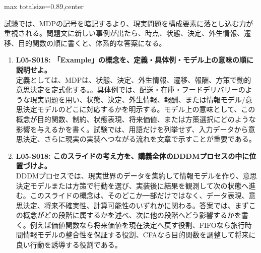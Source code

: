 \begin{minipage}[t]{0.58\textwidth}
\begin{adjustbox}{max totalsize={\textwidth}{0.89\textheight},center}
\begin{minipage}{\textwidth}
試験では、MDPの記号を暗記するより、現実問題を構成要素に落とし込む力が重視される。問題文に新しい事例が出たら、時点、状態、決定、外生情報、遷移、目的関数の順に書くと、体系的な答案になる。\par{}\begin{enumerate}\item \textbf{L05-S018: 「Example」の概念を、定義・具体例・モデル上の意味の順に説明せよ。}\\定義としては、MDPは、状態、決定、外生情報、遷移、報酬、方策で動的意思決定を定式化する。。具体例では、配送・在庫・フードデリバリーのような現実問題を用い、状態、決定、外生情報、報酬、または情報モデル/意思決定モデルのどこに対応するかを明示する。モデル上の意味として、この概念が目的関数、制約、状態表現、将来価値、または方策選択にどのような影響を与えるかを書く。試験では、用語だけを列挙せず、入力データから意思決定、さらに現実の実装へつながる流れを文章で示すことが重要である。\item \textbf{L05-S018: このスライドの考え方を、講義全体のDDDMプロセスの中に位置づけよ。}\\DDDMプロセスでは、現実世界のデータを集約して情報モデルを作り、意思決定モデルまたは方策で行動を選び、実装後に結果を観測して次の状態へ進む。このスライドの概念は、そのどこか一部だけではなく、データ表現、意思決定、将来不確実性、計算可能性のいずれかに関わる。答案では、まずこの概念がどの段階に属するかを述べ、次に他の段階へどう影響するかを書く。例えば価値関数なら将来価値を現在決定へ戻す役割、FIFOなら旅行時間情報モデルの整合性を保証する役割、CFAなら目的関数を調整して将来に良い行動を誘導する役割である。\end{enumerate}
\end{minipage}
\end{adjustbox}
\end{minipage}


